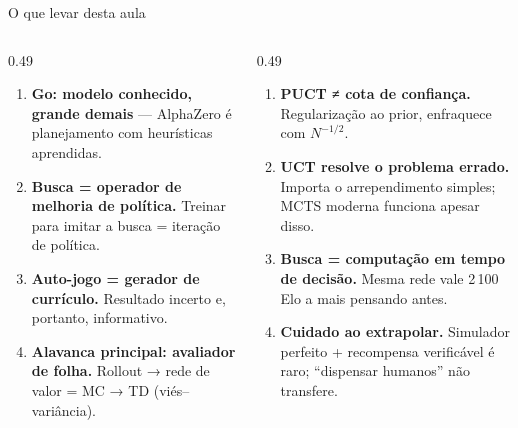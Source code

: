 \documentclass[aspectratio=169, 10pt]{beamer}
\newcommand{\Nvis}{N}
\begin{document}
\begin{frame}{O que levar desta aula}
  \small
  \begin{columns}[T]
    \begin{column}{0.49\textwidth}
      \begin{enumerate}\setlength{\itemsep}{0.35em}
        \item \textbf{Go: modelo conhecido, grande demais} — AlphaZero é planejamento com heurísticas aprendidas.
        \item \textbf{Busca = operador de melhoria de política.} Treinar para imitar a busca = iteração de política.
        \item \textbf{Auto-jogo = gerador de currículo.} Resultado incerto e, portanto, informativo.
        \item \textbf{Alavanca principal: avaliador de folha.} Rollout → rede de valor = MC → TD (viés–variância).
      \end{enumerate}
    \end{column}
    \begin{column}{0.49\textwidth}
      \begin{enumerate}\setlength{\itemsep}{0.35em}\setcounter{enumi}{4}
        \item \textbf{PUCT ≠ cota de confiança.} Regularização ao prior, enfraquece com $\Nvis^{-1/2}$.
        \item \textbf{UCT resolve o problema errado.} Importa o arrependimento simples; MCTS moderna funciona apesar disso.
        \item \textbf{Busca = computação em tempo de decisão.} Mesma rede vale 2\,100 Elo a mais pensando antes.
        \item \textbf{Cuidado ao extrapolar.} Simulador perfeito + recompensa verificável é raro; ``dispensar humanos'' não transfere.
      \end{enumerate}
    \end{column}
  \end{columns}
\end{frame}
\end{document}
